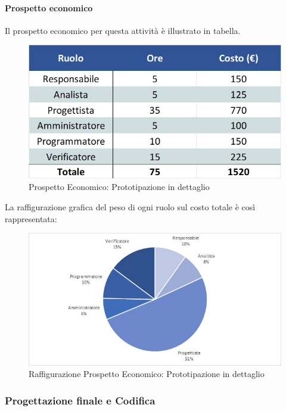 \paragraph{Prospetto economico}
Il prospetto economico per questa attività è illustrato in tabella. 
\begin{figure}[h!]
	\centerline{\includegraphics[scale=0.4]{img/Preventivo/PrototipazioneDettaglio.Economico.jpg}}
	\caption{Prospetto Economico: Prototipazione in dettaglio}
\end{figure}
La raffigurazione grafica del peso di ogni ruolo sul costo totale è così rappresentata:
\begin{figure}[h!]
	\centerline{\includegraphics[scale=0.4]{img/Preventivo/Torte/PrototipazioneDettaglio.jpg}}
	\caption{Raffigurazione Prospetto Economico: Prototipazione in dettaglio}
\end{figure} 

\subsubsection{Progettazione finale e Codifica}
